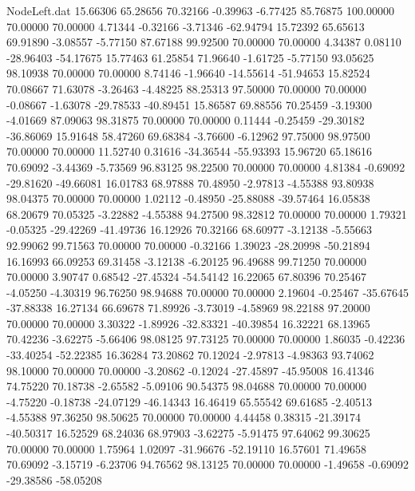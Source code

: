 \begin{filecontents}{NodeLeft.dat}
  15.66306   65.28656   70.32166    -0.39963   -6.77425   85.76875  100.00000   70.00000   70.00000    4.71344   -0.32166   -3.71346  -62.94794
  15.72392   65.65613   69.91890    -3.08557   -5.77150   87.67188   99.92500   70.00000   70.00000    4.34387    0.08110  -28.96403  -54.17675
  15.77463   61.25854   71.96640    -1.61725   -5.77150   93.05625   98.10938   70.00000   70.00000    8.74146   -1.96640  -14.55614  -51.94653
  15.82524   70.08667   71.63078    -3.26463   -4.48225   88.25313   97.50000   70.00000   70.00000   -0.08667   -1.63078  -29.78533  -40.89451
  15.86587   69.88556   70.25459    -3.19300   -4.01669   87.09063   98.31875   70.00000   70.00000    0.11444   -0.25459  -29.30182  -36.86069
  15.91648   58.47260   69.68384    -3.76600   -6.12962   97.75000   98.97500   70.00000   70.00000   11.52740    0.31616  -34.36544  -55.93393
  15.96720   65.18616   70.69092    -3.44369   -5.73569   96.83125   98.22500   70.00000   70.00000    4.81384   -0.69092  -29.81620  -49.66081
  16.01783   68.97888   70.48950    -2.97813   -4.55388   93.80938   98.04375   70.00000   70.00000    1.02112   -0.48950  -25.88088  -39.57464
  16.05838   68.20679   70.05325    -3.22882   -4.55388   94.27500   98.32812   70.00000   70.00000    1.79321   -0.05325  -29.42269  -41.49736
  16.12926   70.32166   68.60977    -3.12138   -5.55663   92.99062   99.71563   70.00000   70.00000   -0.32166    1.39023  -28.20998  -50.21894
  16.16993   66.09253   69.31458    -3.12138   -6.20125   96.49688   99.71250   70.00000   70.00000    3.90747    0.68542  -27.45324  -54.54142
  16.22065   67.80396   70.25467    -4.05250   -4.30319   96.76250   98.94688   70.00000   70.00000    2.19604   -0.25467  -35.67645  -37.88338
  16.27134   66.69678   71.89926    -3.73019   -4.58969   98.22188   97.20000   70.00000   70.00000    3.30322   -1.89926  -32.83321  -40.39854
  16.32221   68.13965   70.42236    -3.62275   -5.66406   98.08125   97.73125   70.00000   70.00000    1.86035   -0.42236  -33.40254  -52.22385
  16.36284   73.20862   70.12024    -2.97813   -4.98363   93.74062   98.10000   70.00000   70.00000   -3.20862   -0.12024  -27.45897  -45.95008
  16.41346   74.75220   70.18738    -2.65582   -5.09106   90.54375   98.04688   70.00000   70.00000   -4.75220   -0.18738  -24.07129  -46.14343
  16.46419   65.55542   69.61685    -2.40513   -4.55388   97.36250   98.50625   70.00000   70.00000    4.44458    0.38315  -21.39174  -40.50317
  16.52529   68.24036   68.97903    -3.62275   -5.91475   97.64062   99.30625   70.00000   70.00000    1.75964    1.02097  -31.96676  -52.19110
  16.57601   71.49658   70.69092    -3.15719   -6.23706   94.76562   98.13125   70.00000   70.00000   -1.49658   -0.69092  -29.38586  -58.05208

\end{filecontents}
